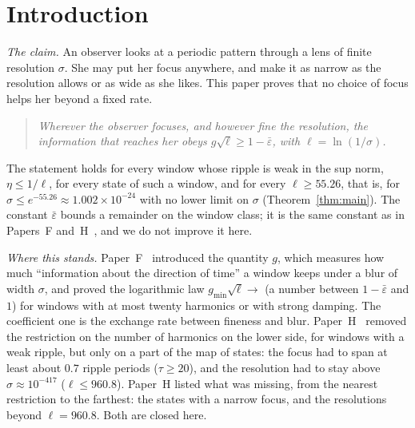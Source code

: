 \section{Introduction}
\label{sec:intro}

\emph{The claim.}
An observer looks at a periodic pattern through a lens of finite resolution $\sigma$.
She may put her focus anywhere, and make it as narrow as the resolution allows or as wide as she likes.
This paper proves that no choice of focus helps her beyond a fixed rate.
\begin{quote}
\emph{Wherever the observer focuses, and however fine the resolution, the information that reaches her obeys $g\sqrt{\ell}\ge1-\bar\varepsilon$, with $\ell=\ln(1/\sigma)$.}
\end{quote}
The statement holds for every window whose ripple is weak in the sup norm, $\eta\le1/\ell$, for every state of such a window, and for every $\ell\ge55.26$, that is, for $\sigma\le e^{-55.26}\approx1.002\times10^{-24}$ with no lower limit on $\sigma$ (Theorem~\ref{thm:main}).
The constant $\bar\varepsilon$ bounds a remainder on the window class; it is the same constant as in Papers~F and~H~\cite{F,H}, and we do not improve it here.

\emph{Where this stands.}
Paper~F~\cite{F} introduced the quantity $g$, which measures how much ``information about the direction of time'' a window keeps under a blur of width $\sigma$, and proved the logarithmic law $g_{\min}\sqrt\ell\to$ (a number between $1-\bar\varepsilon$ and $1$) for windows with at most twenty harmonics or with strong damping.
The coefficient one is the exchange rate between fineness and blur.
Paper~H~\cite{H} removed the restriction on the number of harmonics on the lower side, for windows with a weak ripple, but only on a part of the map of states:
the focus had to span at least about $0.7$ ripple periods ($\tau\ge20$), and the resolution had to stay above $\sigma\approx10^{-417}$ ($\ell\le960.8$).
Paper~H listed what was missing, from the nearest restriction to the farthest: the states with a narrow focus, and the resolutions beyond $\ell=960.8$.
Both are closed here.

